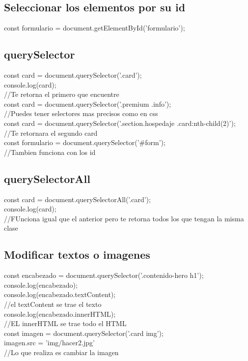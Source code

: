 \documentclass[10pt,a4paper]{article}
\begin{document}
\subsection{Seleccionar los elementos por su id} 
const formulario  = document.getElementById('formulario');\\
\subsection{querySelector} 
const card =  document.querySelector('.card');\\
console.log(card); \\
//Te retorna el primero que encuentre \\
const card =  document.querySelector('.premium .info'); \\
//Puedes tener selectores mas precisos como en css \\
const card =  document.querySelector('.section.hospedaje .card:nth-child(2)'); \\
//Te retornara el segundo card \\
const formulario =  document.querySelector('$ \# $form'); \\
//Tambien funciona con los id \\
\subsection{querySelectorAll} 
const card = document.querySelectorAll('.card'); \\
console.log(card); \\
//FUnciona igual que el anterior pero te retorna todos los que tengan la misma clase \\
\subsection{Modificar textos o imagenes}
const encabezado = document.querySelector('.contenido-hero h1'); \\
console.log(encabezado); \\
console.log(encabezado.textContent); \\
//el textContent se trae el texto \\
console.log(encabezado.innerHTML); \\
//EL innerHTML se trae todo el HTML \\
const imagen = document.querySelector('.card img'); \\
imagen.src = 'img/hacer2.jpg'\\
//Lo que realiza es cambiar la imagen \\
\end{document}
